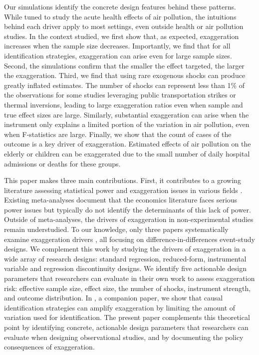 \documentclass[12pt]{article}
\begin{document}
		Our simulations identify the concrete design features behind these patterns. While tuned to study the acute health effects of air pollution, the intuitions behind each driver apply to most settings, even outside health or air pollution studies. In the context studied, we first show that, as expected, exaggeration increases when the sample size decreases. Importantly, we find that for all identification strategies, exaggeration can arise even for large sample sizes. Second, the simulations confirm that the smaller the effect targeted, the larger the exaggeration. Third, we find that using rare exogenous shocks can produce greatly inflated estimates. The number of shocks can represent less than 1\% of the observations for some studies leveraging public transportation strikes or thermal inversions, leading to large exaggeration ratios even when sample and true effect sizes are large. Similarly, substantial exaggeration can arise when the instrument only explains a limited portion of the variation in air pollution, even when F-statistics are large. Finally, we show that the count of cases of the outcome is a key driver of exaggeration. Estimated effects of air pollution on the elderly or children can be exaggerated due to the small number of daily hospital admissions or deaths for these groups.
		 
		 This paper makes three main contributions. First, it contributes to a growing literature assessing statistical power and exaggeration issues in various fields \citep{ioannidis_why_2008, gelman_beyond_2014, ioannidis_power_2017, ferraro_feature_2020, stommes_reliability_2023, arel-bundock_quantitative_2024}. Existing meta-analyses document that the economics literature faces serious power issues but typically do not identify the determinants of this lack of power. Outside of meta-analyses, the drivers of exaggeration in non-experimental studies remain understudied. To our knowledge, only three papers systematically examine exaggeration drivers \citep{schell_evaluating_2018, griffin_moving_2021, black_simulated_2022}, all focusing on difference-in-differences event-study designs. We complement this work by studying the drivers of exaggeration in a wide array of research designs: standard regression, reduced-form, instrumental variable and regression discontinuity designs. We identify five actionable design parameters that researchers can evaluate in their own work to assess exaggeration risk: effective sample size, effect size, the number of shocks, instrument strength, and outcome distribution. In \cite{bagilet_causal_2026}, a companion paper, we show that causal identification strategies can amplify exaggeration by limiting the amount of variation used for identification. The present paper complements this theoretical point by identifying concrete, actionable design parameters that researchers can evaluate when designing observational studies, and by documenting the policy consequences of exaggeration.
		 
\end{document}
